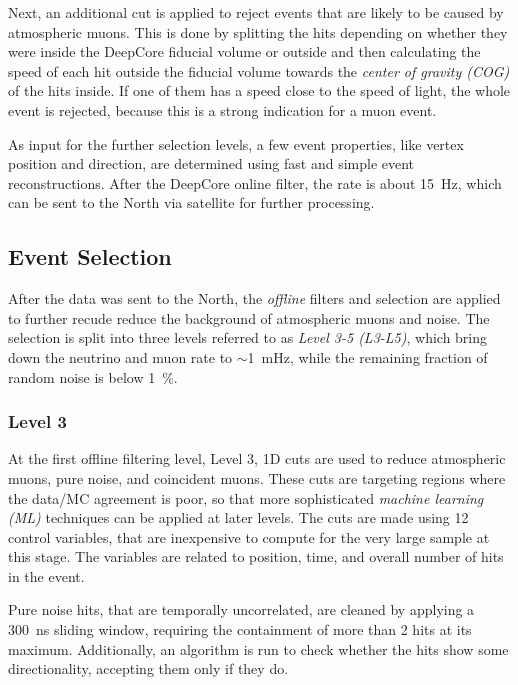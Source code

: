Next, an additional cut is applied to reject events that are likely to be caused by atmospheric muons. This is done by splitting the hits depending on whether they were inside the DeepCore fiducial volume or outside and then calculating the speed of each hit outside the fiducial volume towards the \textit{center of gravity (COG)} of the hits inside. If one of them has a speed close to the speed of light, the whole event is rejected, because this is a strong indication for a muon event.

As input for the further selection levels, a few event properties, like vertex position and direction, are determined using fast and simple event reconstructions. After the DeepCore online filter, the rate is about \SI{15}{\hertz}, which can be sent to the North via satellite for further processing.


\subsection{Event Selection} 

After the data was sent to the North, the \textit{offline} filters and selection are applied to further recude reduce the background of atmospheric muons and noise. The selection is split into three levels referred to as \textit{Level 3-5 (L3-L5)}, which bring down the neutrino and muon rate to $\sim$\SI{1}{\milli\hertz}, while the remaining fraction of random noise is below \SI{1}{\percent}.


\subsubsection{Level 3} 

At the first offline filtering level, Level 3, 1D cuts are used to reduce atmospheric muons, pure noise, and coincident muons. These cuts are targeting regions where the data/MC agreement is poor, so that more sophisticated \textit{machine learning (ML)} techniques can be applied at later levels. The cuts are made using 12 control variables, that are inexpensive to compute for the very large sample at this stage. The variables are related to position, time, and overall number of hits in the event.

Pure noise hits, that are temporally uncorrelated, are cleaned by applying a \SI{300}{\nano\second} sliding window, requiring the containment of more than 2 hits at its maximum. Additionally, an algorithm is run to check whether the hits show some directionality, accepting them only if they do.

